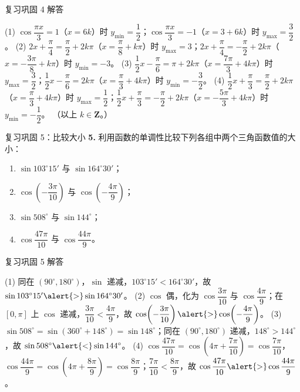 \documentclass[10pt,aspectratio=169,serif]{beamer}
\begin{document}
\begin{frame}[t]{复习巩固 4 解答}
\begin{tcolorbox}[colback=orange!10,colframe=orange,title=\textbf{解}]
(1) $\cos\dfrac{\pi x}{3}=1$（$x=6k$）时 $y_{\min}=\dfrac12$；$\cos\dfrac{\pi x}{3}=-1$（$x=3+6k$）时 $y_{\max}=\dfrac32$。
\vspace{0.2em}
(2) $2x+\dfrac\pi4=\dfrac\pi2+2k\pi$（$x=\dfrac\pi8+k\pi$）时 $y_{\max}=3$；$2x+\dfrac\pi4=-\dfrac\pi2+2k\pi$（$x=-\dfrac{3\pi}{8}+k\pi$）时 $y_{\min}=-3$。
\vspace{0.2em}
(3) $\dfrac12x-\dfrac\pi6=\pi+2k\pi$（$x=\dfrac{7\pi}{3}+4k\pi$）时 $y_{\max}=\dfrac32$；$\dfrac12x-\dfrac\pi6=2k\pi$（$x=\dfrac\pi3+4k\pi$）时 $y_{\min}=-\dfrac32$。
\vspace{0.2em}
(4) $\dfrac12x+\dfrac\pi3=\dfrac\pi2+2k\pi$（$x=\dfrac\pi3+4k\pi$）时 $y_{\max}=\dfrac12$；$\dfrac12x+\dfrac\pi3=-\dfrac\pi2+2k\pi$（$x=-\dfrac{5\pi}{3}+4k\pi$）时 $y_{\min}=-\dfrac12$。
\small（以上 $k\in\mathbf Z$。）
\end{tcolorbox}
\end{frame}

\begin{frame}[t]{复习巩固 5：比较大小}
\textbf{5.} 利用函数的单调性比较下列各组中两个三角函数值的大小：
\begin{enumerate}[(1)]
  \item $\sin103^\circ15'$ 与 $\sin164^\circ30'$； \qquad
  \item $\cos\!\left(-\dfrac{3\pi}{10}\right)$ 与 $\cos\!\left(-\dfrac{4\pi}{9}\right)$；
  \item $\sin508^\circ$ 与 $\sin144^\circ$； \qquad
  \item $\cos\dfrac{47\pi}{10}$ 与 $\cos\dfrac{44\pi}{9}$。
\end{enumerate}
\end{frame}

\begin{frame}[t]{复习巩固 5 解答}
\begin{tcolorbox}[colback=orange!10,colframe=orange,title=\textbf{解}]
(1) 同在 $(90^\circ,180^\circ)$，$\sin$ 递减，$103^\circ15'<164^\circ30'$，故 $\sin103^\circ15'\alert{>}\sin164^\circ30'$。
\vspace{0.2em}
(2) $\cos$ 偶，化为 $\cos\dfrac{3\pi}{10}$ 与 $\cos\dfrac{4\pi}{9}$；在 $[0,\pi]$ 上 $\cos$ 递减，$\dfrac{3\pi}{10}<\dfrac{4\pi}{9}$，故 $\cos\!\left(-\dfrac{3\pi}{10}\right)\alert{>}\cos\!\left(-\dfrac{4\pi}{9}\right)$。
\vspace{0.2em}
(3) $\sin508^\circ=\sin(360^\circ+148^\circ)=\sin148^\circ$；同在 $(90^\circ,180^\circ)$ 递减，$148^\circ>144^\circ$，故 $\sin508^\circ\alert{<}\sin144^\circ$。
\vspace{0.2em}
(4) $\cos\dfrac{47\pi}{10}=\cos\!\left(4\pi+\dfrac{7\pi}{10}\right)=\cos\dfrac{7\pi}{10}$，$\cos\dfrac{44\pi}{9}=\cos\!\left(4\pi+\dfrac{8\pi}{9}\right)=\cos\dfrac{8\pi}{9}$；$\dfrac{7\pi}{10}<\dfrac{8\pi}{9}$，故 $\cos\dfrac{47\pi}{10}\alert{>}\cos\dfrac{44\pi}{9}$。
\end{tcolorbox}
\end{frame}
\end{document}
